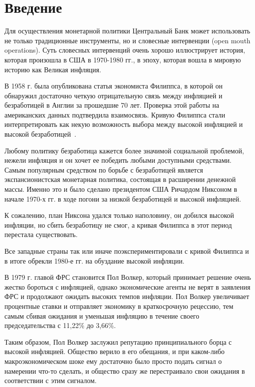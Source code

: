 





\chapter*{Введение}


Для осуществления монетарной политики Центральный Банк может использовать не только традиционные инструменты, но и словесные интервенции (open mouth operations). Суть словесных интервенций очень хорошо иллюстрирует история, которая произошла в США в 1970-1980 гг., в эпоху, которая вошла в мировую историю как Великая инфляция. 

В 1958 г. была опубликована статья экономиста Филиппса, в которой он обнаружил достаточно четкую отрицательную связь между инфляцией и безработицей в Англии за прошедшие 70 лет. Проверка этой работы на американских данных подтвердила взаимосвязь. Кривую Филиппса стали интерпретировать как некую возможность выбора между высокой инфляцией и высокой безработицей~\cite{phillips1958relation}.

Любому политику безработица кажется более значимой социальной проблемой, нежели инфляция и он хочет ее победить любыми доступными средствами. Самым популярным средством по борьбе с безработицей является экспансионистская монетарная политика, состоящая в расширении денежной массы. Именно это и было сделано президентом США Ричардом Никсоном в начале 1970-х гг. в ходе погони за низкой безработицей и высокой инфляцией.

К сожалению, план Никсона удался только наполовину, он добился высокой инфляции, но сбить безработицу не смог, а кривая Филиппса в этот период перестала существовать. 

Все западные страны так или иначе поэкспериментировали с кривой Филиппса и в итоге обрекли 1980-е гг. на обуздание высокой инфляции.

В 1979 г. главой ФРС становится Пол Волкер, который принимает решение очень жестко бороться с инфляцией, однако экономические агенты не верят в заявления ФРС и продолжают ожидать высоких темпов инфляции. Пол Волкер увеличивает процентные ставки и отправляет экономику в краткосрочную рецессию, тем самым сбивая ожидания и уменьшая инфляцию в течение своего председательства с 11,22\% до 3,66\%. 

Таким образом, Пол Волкер заслужил репутацию принципиального борца с высокой инфляцией. Общество верило в его обещания, и при каком-либо макроэкономическом шоке ему достаточно было просто подать сигнал о намерении что-то сделать, и общество сразу же перестраивало свои ожидания в соответствии с этим сигналом.

